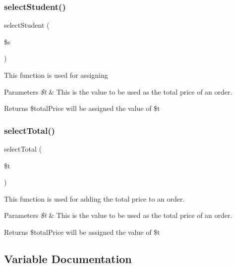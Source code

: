 \subsubsection{\texorpdfstring{selectStudent()}{selectStudent()}}
{\footnotesize\ttfamily select\+Student (\begin{DoxyParamCaption}\item[{}]{\$s }\end{DoxyParamCaption})}

This function is used for assigning 
\begin{DoxyParams}{Parameters}
{\em \$t} & This is the value to be used as the total price of an order. \\
\hline
\end{DoxyParams}
\begin{DoxyReturn}{Returns}
\$total\+Price will be assigned the value of \$t 
\end{DoxyReturn}
\mbox{\label{_pickup___order___selection_8class_8php_a8479e007f854c94229714a8425c5b6c0}} 
\subsubsection{\texorpdfstring{selectTotal()}{selectTotal()}}
{\footnotesize\ttfamily select\+Total (\begin{DoxyParamCaption}\item[{}]{\$t }\end{DoxyParamCaption})}

This function is used for adding the total price to an order. 
\begin{DoxyParams}{Parameters}
{\em \$t} & This is the value to be used as the total price of an order. \\
\hline
\end{DoxyParams}
\begin{DoxyReturn}{Returns}
\$total\+Price will be assigned the value of \$t 
\end{DoxyReturn}


\subsection{Variable Documentation}
\mbox{\label{_pickup___order___selection_8class_8php_a97cbe643c0895109f345f68609533958}} 

